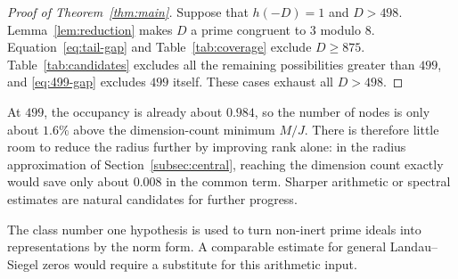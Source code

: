 \begin{proof}[Proof of Theorem~\ref{thm:main}]
Suppose that $h(-D)=1$ and $D>498$. Lemma~\ref{lem:reduction} makes $D$ a
prime congruent to $3$ modulo $8$. Equation~\eqref{eq:tail-gap} and
Table~\ref{tab:coverage} exclude $D\geq875$. Table~\ref{tab:candidates}
excludes all the remaining possibilities greater than $499$, and
\eqref{eq:499-gap} excludes $499$ itself. These cases exhaust all $D>498$.
\end{proof}

At $499$, the occupancy is already about $0.984$, so the number of nodes
is only about $1.6\%$ above the dimension-count minimum $M/J$. There is
therefore little room to reduce the radius further by improving rank alone:
in the radius approximation of Section~\ref{subsec:central}, reaching the
dimension count exactly would save only about $0.008$ in the common term.
Sharper arithmetic or spectral estimates are natural candidates for further
progress.

The class number one hypothesis is used to turn non-inert prime ideals into
representations by the norm form. A comparable estimate for general
Landau--Siegel zeros would require a substitute for this arithmetic input.
